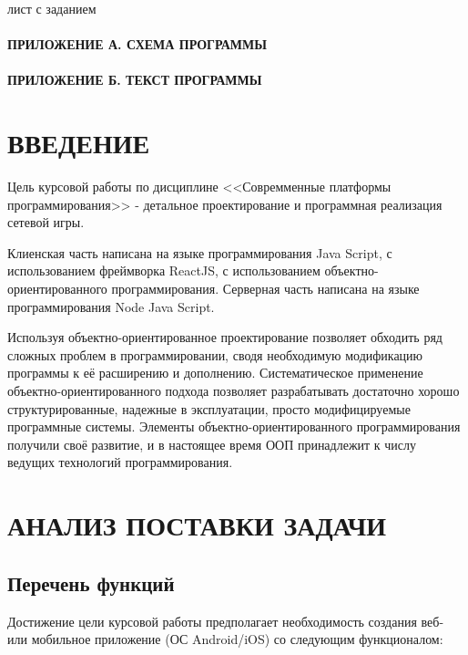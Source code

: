 \documentclass[12pt, a4paper, simple]{eskdtext}
\begin{document}
    

    лист с заданием
    \newpage

    \tableofcontents                                
    \paragraph{ПРИЛОЖЕНИЕ А. СХЕМА ПРОГРАММЫ}
    \paragraph{ПРИЛОЖЕНИЕ Б. ТЕКСТ ПРОГРАММЫ}
    \newpage

    \newpage
    \section*{ВВЕДЕНИЕ}

    Цель курсовой работы по дисциплине <<Совремменные платформы программирования>> - детальное проектирование и программная реализация сетевой игры.

    Клиенская часть написана на языке программирования Java Script, с использованием фреймворка ReactJS,
    с использованием объектно-ориентированного программирования.
    Серверная часть написана на языке программирования Node Java Script.

    Используя объектно-ориентированное проектирование позволяет обходить ряд сложных проблем в программировании,
    сводя необходимую модификацию программы к её расширению и дополнению.
    Систематическое применение объектно-ориентированного подхода позволяет разрабатывать достаточно хорошо структурированные,
    надежные в эксплуатации, просто модифицируемые программные системы.
    Элементы объектно-ориентированного программирования получили своё развитие, и в настоящее время ООП принадлежит к числу ведущих технологий программирования.

    \newpage

    \section{АНАЛИЗ ПОСТАВКИ ЗАДАЧИ}
    \subsection{Перечень функций}

    Достижение цели курсовой работы предполагает необходимость создания веб- или мобильное приложение (ОС Android/iOS) со следующим функционалом:
    
\end{document}
